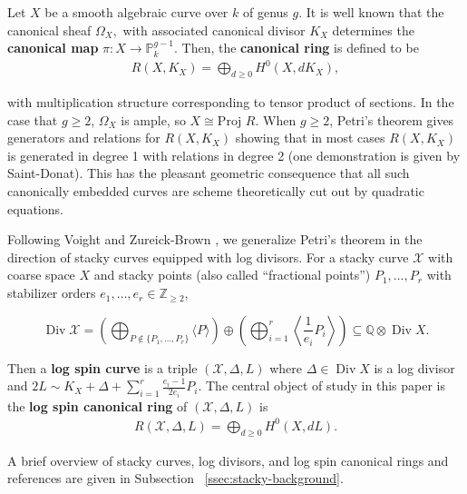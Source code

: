\documentclass{amsart}
\theoremstyle{plain}
\theoremstyle{definition}
\theoremstyle{remark}
\numberwithin{equation}{section}
\newcommand\BQ{{\mathbb Q}}
\newcommand\BP{{\mathbb P}}
\newcommand\BZ{{\mathbb Z}}
\newcommand \sx{\mathscr X}
\newcommand \proj{\text{Proj }}
\DeclareMathOperator\di{Div}
\newcommand \subhalf[1]{\frac{{#1} - 1}{2{#1}}}
\newcommand{\halfcan}{L}
\begin{document}
Let $X$ be a smooth algebraic curve over $k$ of genus $g$. It is
well known that the canonical sheaf $\Omega _X,$ with associated canonical divisor $K_X$
 determines the {\bf canonical map } $\pi:X \rightarrow \BP_k^{g - 1}$.
Then, the {\bf canonical ring} is defined to be
\begin{align*}
	R(X,K_X) = \bigoplus_{d \geq 0} H^0(X, dK_X),
\end{align*}

\noindent
with multiplication structure corresponding to tensor product of
sections. In the case that $g \geq 2$, $\Omega_X$ is ample, so $X \cong \proj R$. When $g \geq 2$, Petri's
theorem gives generators and relations for $R(X, K_X)$ showing that
in most cases $R(X, K_X)$ is generated in degree 1 with relations
in degree 2 (one demonstration is given by Saint-Donat\cite[p. 157]
{saint-donat:proj}). This has the pleasant geometric consequence 
that all such canonically embedded curves are scheme theoretically 
cut out by quadratic equations.

Following Voight and Zureick-Brown \cite{vzb:stacky}, we generalize 
Petri's theorem in the direction of stacky curves equipped with
log divisors. For a stacky curve $\sx$ with coarse space $X$ and
stacky points (also called ``fractional points'') $P_1, \ldots, P_r$
with stabilizer orders $e_1, \ldots, e_r \in \BZ_{\geq 2}$,

\[
	\di \sx = \left(\bigoplus_{P\notin \{P_1,\ldots, P_r\}} \langle 
	P \rangle \right) \oplus \left(\bigoplus_{i = 1}^r \left \langle 
	\frac{1}{e_i}P_i \right \rangle \right) \subseteq \BQ \otimes \di X.
\]

Then a {\bf log spin curve} is a triple $(\sx, \Delta, \halfcan)$
where $\Delta \in \di X$ is a log divisor and $2\halfcan \sim K_X +
\Delta + \sum_{i = 1}^{r} \subhalf{e_i} P_i$. The central object of
study in this paper is the {\bf log spin canonical ring} of $(\sx,
\Delta, \halfcan)$ is
\begin{align*}
	R(\sx, \Delta, \halfcan) = \bigoplus_{d \geq 0} H^0(X, d \halfcan).
\end{align*}

\noindent
A brief overview of stacky curves, log divisors, and log spin
canonical rings and references are given in Subsection
~\ref{ssec:stacky-background}.

\end{document}
